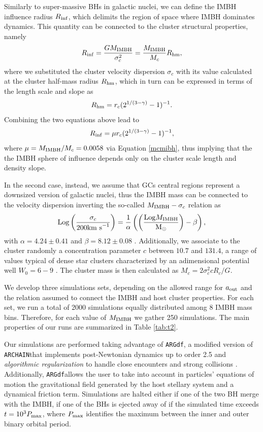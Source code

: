 \documentclass[twocolumn]{aastex62}
\newcommand{\Log}{{\rm Log}}
\newcommand{\Ms}{{\rm M}_\odot}
\newcommand{\ibh}{{\rm IMBH}}
\newcommand{\out}{{\rm out}}
\newcommand{\ARGdf}{\texttt{ARGdf}}
\newcommand{\ARCHAIN}{\texttt{ARCHAIN}}
\begin{document}
Similarly to super-massive BHs in galactic nuclei, we can define the IMBH influence radius $R_{\rm inf}$, which delimits the region of space where IMBH dominates dynamics. This quantity can be connected to the cluster structural properties, namely
 \begin{equation}
 R_{\rm inf} = \frac{GM_\ibh}{\sigma_c^2} = \frac{M_\ibh}{M_c}R_{\rm hm},
 \end{equation}
 where we substituted the cluster velocity dispersion $\sigma_c$ with its value calculated at the cluster half-mass radius $R_{\rm hm}$, which in turn can be expressed in terms of the length scale and slope as
\begin{equation}
R_{\rm hm} = r_c(2^{1/(3-\gamma)}-1)^{-1}.
\end{equation} 
Combining the two equations above lead to 
\begin{equation}
R_{\rm inf} = \mu r_c(2^{1/(3-\gamma)}-1)^{-1},
\end{equation}
where $\mu = M_\ibh/M_c = 0.0058$ via Equation \ref{mcmibh}, thus implying that the the IMBH sphere of influence depends only on the cluster scale length and density slope. 

In the second case, instead, we assume that GCs central regions represent a downsized version of galactic nuclei, thus the IMBH mass can be connected to the velocity dispersion inverting the so-called $M_\ibh - \sigma_c$ relation as 
\begin{equation}
     \Log \left(\frac{\sigma_c}{200{\rm km~s}^{-1}}\right) = \frac{1}{\alpha}\left(\left(\frac{\Log M_\ibh}{\Ms}\right) - \beta\right) ,
\end{equation}
with $\alpha = 4.24\pm0.41$ and $\beta=8.12\pm 0.08$ \citep{gultekin09}. Additionally, we associate to the cluster randomly a concentration parameter $c$ between $10.7$ and $131.4$, a range of values typical of dense star clusters characterized by an adimensional potential well $W_0 = 6-9$ \citep{king62}. The cluster mass is then calculated as $M_c = 2\sigma_c^2 c R_c / G$.

We develop three simulations sets, depending on the allowed range for $a_\out$ and the relation assumed to connect the IMBH and host cluster properties. For each set, we run a total of 2000 simulations equally distributed among 8 IMBH mass bins. Therefore, for each value of $M_\ibh$ we gather 250 simulations. The main properties of our runs are summarized in Table \ref{tab:t2}.

Our simulations are performed taking advantage of \ARGdf \citep{ASCD19}, a modified version of \ARCHAIN that implements post-Newtonian dynamics up to order 2.5 and {\it algorithmic regularization} to handle close encounters and strong collisions \citep{mikkola99,mikkola08}. Additionally, \ARGdf allows the user to take into account in particles' equations of motion the gravitational field generated by the host stellary system and a dynamical friction term. Simulations are halted either if one of the two BH merge with the IMBH, if one of the BHs is ejected away of if the simulated time exceeds $t = 10^3 P_{\rm max}$, where $P_{\rm max}$ identifies the maximum between the inner and outer binary orbital period.
\end{document}

